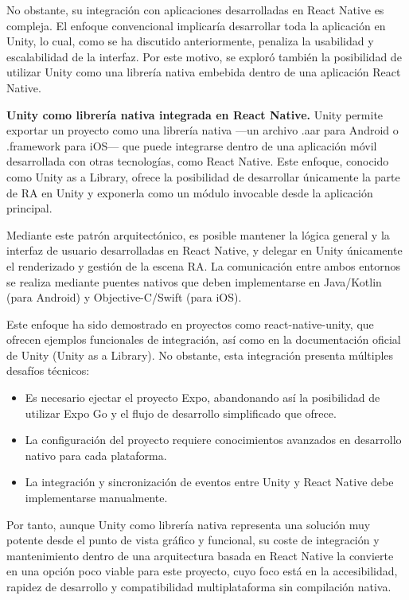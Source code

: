 No obstante, su integración con aplicaciones desarrolladas en React Native es compleja. El enfoque convencional implicaría desarrollar toda la aplicación en Unity, lo cual, como se ha discutido anteriormente, penaliza la usabilidad y escalabilidad de la interfaz. Por este motivo, se exploró también la posibilidad de utilizar Unity como una librería nativa embebida dentro de una aplicación React Native.

\textbf{Unity como librería nativa integrada en React Native.}
Unity permite exportar un proyecto como una librería nativa —un archivo .aar para Android o .framework para iOS— que puede integrarse dentro de una aplicación móvil desarrollada con otras tecnologías, como React Native. Este enfoque, conocido como Unity as a Library, ofrece la posibilidad de desarrollar únicamente la parte de RA en Unity y exponerla como un módulo invocable desde la aplicación principal.

Mediante este patrón arquitectónico, es posible mantener la lógica general y la interfaz de usuario desarrolladas en React Native, y delegar en Unity únicamente el renderizado y gestión de la escena RA. La comunicación entre ambos entornos se realiza mediante puentes nativos que deben implementarse en Java/Kotlin (para Android) y Objective-C/Swift (para iOS).

Este enfoque ha sido demostrado en proyectos como react-native-unity, que ofrecen ejemplos funcionales de integración, así como en la documentación oficial de Unity (Unity as a Library). No obstante, esta integración presenta múltiples desafíos técnicos:

\begin{itemize}
    \item Es necesario ejectar el proyecto Expo, abandonando así la posibilidad de utilizar Expo Go y el flujo de desarrollo simplificado que ofrece.
    \item La configuración del proyecto requiere conocimientos avanzados en desarrollo nativo para cada plataforma.
    \item La integración y sincronización de eventos entre Unity y React Native debe implementarse manualmente.
\end{itemize}

Por tanto, aunque Unity como librería nativa representa una solución muy potente desde el punto de vista gráfico y funcional, su coste de integración y mantenimiento dentro de una arquitectura basada en React Native la convierte en una opción poco viable para este proyecto, cuyo foco está en la accesibilidad, rapidez de desarrollo y compatibilidad multiplataforma sin compilación nativa.

